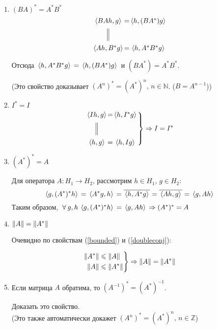 \documentclass[12pt]{article}
\begin{document}
\begin{enumerate}
		\item $(BA)^{*} = A^{*}B^{*}$
		$$
		\begin{CD}
			\scal{BAh}{g} @. = @. \scal{h}{(BA^{*})g} \\
				@| \\
			\scal{Ah}{B^{*}g} @. = @. \scal{h}{A^{*}B^{*}g}
		\end{CD}
		$$
		
		Отсюда $\, \langle h, A^{*}B^{*}g \rangle \, = \, \langle h, (BA^{*})g \rangle \,$ и $(BA^{*}) = A^{*}B^{*}$.
		
		{\Large(}Это свойство доказывает $(A^n)^{*} = (A^{*})^n,\, n \in \mathbb{N}$. ($B=A^{n-1}$){\Large)} \\
		
		\item $I^{*} = I$
		$$
		\left.
		\begin{CD}
			\scal{Ih}{g} @. = @. \scal{h}{I^{*}g} \\
				@| \\
			\scal{h}{g} @. = @. \scal{h}{Ig}
		\end{CD}
		\right\} \Rightarrow I = I^{*}
		$$
		
		\item $(A^{*})^{*} = A$ \label{doubleconj}
		
		Для оператора $A: H_1 \rightarrow H_2$, рассмотрим $h \in H_1$, $g \in H_2$:
		$$
			\, \langle g, (A^{*})^{*}h \rangle \, = \, \langle A^{*}g, h \rangle \, = \overline{\, \langle h, A^{*}g \rangle \,} = 
			\overline{\, \langle Ah, g \rangle \,} = \, \langle g, Ah \rangle \,
		$$
		Таким образом, $\forall g,h \: \scal{g}{(A^{*})^{*}h} = \scal{g}{Ah} \Rightarrow (A^{*})^{*} = A$
		
		\item $\| A \| = \| A^{*} \|$
		
		Очевидно по свойствам (\ref{bounded}) и (\ref{doubleconj}):
		
		$$
		\left.
		\begin{aligned}
			\| A^{*} \| &\leqslant \| A \| \\
			\| A \| &\leqslant \| A^{*} \|
		\end{aligned}
		\right\}
		\Rightarrow \| A \| = \| A^{*} \|
		$$
		
		\item Если матрица $A$ обратима, то $(A^{-1})^{*} = (A^{*})^{-1}$.
		
		\exc Доказать это свойство. \\
		{\Large(}Это также автоматически докажет $(A^n)^{*} = (A^{*})^n,\, n \in \mathbb{Z}${\Large)}
	\end{enumerate}
	
\end{document}
